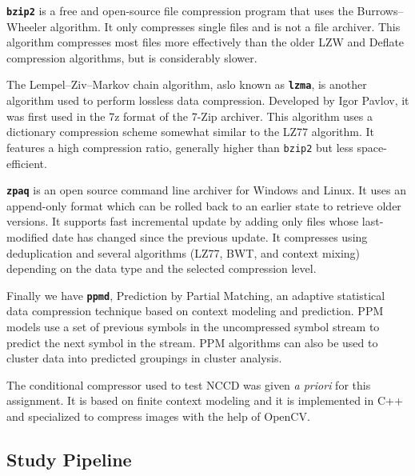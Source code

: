 \documentclass[12pt]{article}
\begin{document}
\textbf{\texttt{bzip2}} is a free and open-source file compression program that uses the Burrows–Wheeler algorithm. 
It only compresses single files and is not a file archiver. 
This algorithm compresses most files more effectively than the older LZW and Deflate compression algorithms, but is considerably slower. 

The Lempel–Ziv–Markov chain algorithm, aslo known as \textbf{\texttt{lzma}}, is another algorithm used to perform lossless data compression. 
Developed by Igor Pavlov, it was first used in the 7z format of the 7-Zip archiver. 
This algorithm uses a dictionary compression scheme somewhat similar to the LZ77 algorithm.
It features a high compression ratio, generally higher than \texttt{bzip2} but less space-efficient.

\textbf{\texttt{zpaq}} is an open source command line archiver for Windows and Linux. 
It uses an append-only format which can be rolled back to an earlier state to retrieve older versions. 
It supports fast incremental update by adding only files whose last-modified date has changed since the previous update. 
It compresses using deduplication and several algorithms (LZ77, BWT, and context mixing) depending on the data type and the selected compression level.

Finally we have \textbf{\texttt{ppmd}}, Prediction by Partial Matching, an adaptive statistical data compression technique based on context modeling and prediction. 
PPM models use a set of previous symbols in the uncompressed symbol stream to predict the next symbol in the stream. 
PPM algorithms can also be used to cluster data into predicted groupings in cluster analysis.
\newline

The conditional compressor used to test NCCD was given \textit{a priori} for this assignment.
It is based on finite context modeling and it is implemented in C++ and specialized to compress images with the help of OpenCV.

\subsection{Study Pipeline} \label{pipeline} %
\end{document}
